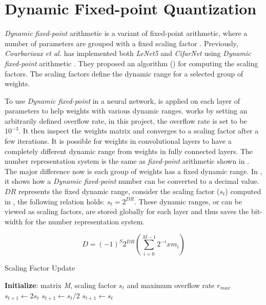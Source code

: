 \documentclass[a4paper,12pt]{report}
\begin{document}
\section{Dynamic Fixed-point Quantization}
\label{sec:dfq}
\textit{Dynamic fixed-point} arithmetic is a variant of fixed-point arithmetic,
where a number of parameters are grouped with a fixed scaling factor \cite{williamson1991dynamically}.
Previously, \textit{Courbariaux et al.} has implemented both \textit{LeNet5} and
\textit{CifarNet} using \textit{Dynamic fixed-point} arithmetic \cite{courbariaux2014training}.
They proposed an algorithm () for computing the scaling factors.
The scaling factors define the dynamic range for a selected group of weights.

To use \textit{Dynamic fixed-point} in a neural network, 
is applied  on each layer of parameters to help weights with various dynamic ranges.
 works by setting an arbitrarily defined overflow rate,
in this project, the overflow rate is set to be $10^{-3}$.
It then inspect the weights matrix and converges to a scaling factor after a
few iterations.
It is possible for weights in convolutional layers to have a completely different
dynamic range from weights in fully connected layers.
The number representation system is the same as \textit{fixed-point} arithmetic
shown in .
The major difference now is each group of weights has a fixed dynamic range.
In , it shows how a \textit{Dynamic fixed-point} number can be
converted to a decimal value.
$DR$ represents the fixed dynamic range, consider the scaling factor ($s_t$)
computed in , the following relation holds: $s_t = 2^{DR}$.
These dynamic ranges, or can be viewed as scaling factors, are stored globally
for each layer and thus saves the bit-width for the number representation system.

\begin{equation}
    D = (-1)^S 2^{DR}(\sum^{M-1}_{i=0}2^{-i}xm_i)
    \label{equ:d2ddfp}
\end{equation}

\begin{algorithm}
\caption{Scaling Factor Update} \label{alg:scaling_factor}
\begin{algorithmic}[1]
\STATE \textbf{Initialize}: matrix \textit{M}, scaling factor $s_t$ and maximum overflow rate $r_{max}$
  \STATE $s_{t+1} \gets 2s_t$
  \STATE $s_{t+1} \gets s_t/2$
\ELSE
  \STATE $s_{t+1} \gets s_t$
\ENDIF
\ENDWHILE
\end{algorithmic}
\end{algorithm}
\end{document}
